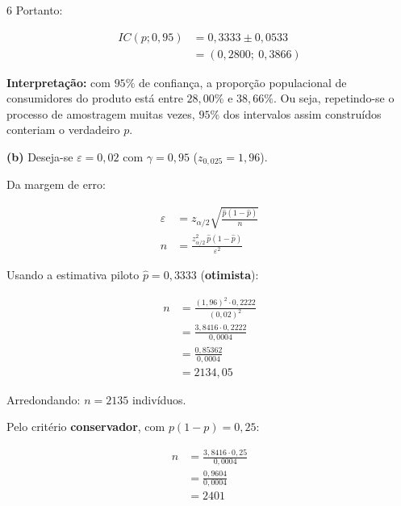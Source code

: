 \documentclass[8pt, a4paper, landscape]{extarticle}
\begin{document}
\begin{multicols}{6}
Portanto:

\begin{equation*}
\begin{split}
IC(p;0,95) &= 0,3333 \pm 0,0533 \\
&= (0,2800;\ 0,3866)
\end{split}
\end{equation*}

\textbf{Interpretação:} com $95\%$ de confiança, a proporção populacional de consumidores do produto está entre $28,00\%$ e $38,66\%$. Ou seja, repetindo-se o processo de amostragem muitas vezes, $95\%$ dos intervalos assim construídos conteriam o verdadeiro $p$.

\vspace{0.2cm}

\textbf{(b)} Deseja-se $\varepsilon = 0,02$ com $\gamma = 0,95$ ($z_{0,025} = 1,96$).

Da margem de erro:

\begin{equation*}
\begin{split}
\varepsilon &= z_{\alpha/2}\sqrt{\frac{\hat{p}(1-\hat{p})}{n}} \\
n &= \frac{z_{\alpha/2}^2\,\hat{p}(1-\hat{p})}{\varepsilon^2}
\end{split}
\end{equation*}

Usando a estimativa piloto $\hat{p} = 0,3333$ (\textbf{otimista}):

\begin{equation*}
\begin{split}
n &= \frac{(1,96)^2 \cdot 0,2222}{(0,02)^2} \\
&= \frac{3,8416 \cdot 0,2222}{0,0004} \\
&= \frac{0,85362}{0,0004} \\
&= 2134,05
\end{split}
\end{equation*}

Arredondando: $n = 2135$ indivíduos.

Pelo critério \textbf{conservador}, com $p(1-p) = 0,25$:

\begin{equation*}
\begin{split}
n &= \frac{3,8416 \cdot 0,25}{0,0004} \\
&= \frac{0,9604}{0,0004} \\
&= 2401
\end{split}
\end{equation*}


\end{multicols}
\end{document}
